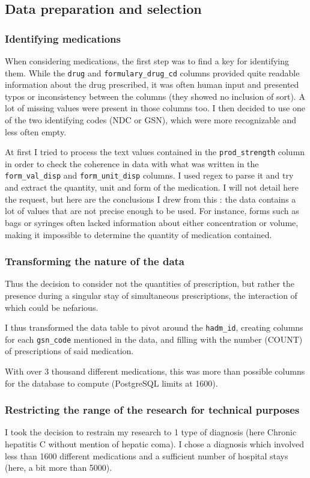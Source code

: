 \documentclass[a4paper,12pt]{article}
\begin{document}
\subsection{Data preparation and selection}
\subsubsection{Identifying medications}
When considering medications, the first step was to find a key for identifying them. While the \texttt{drug} and \texttt{formulary\_drug\_cd} columns provided quite readable information about the drug prescribed, it was often human input and presented typos or inconsistency between the columns (they showed no inclusion of sort). A lot of missing values were present in those columns too. I then decided to use one of the two identifying codes (NDC or GSN), which were more recognizable and less often empty.

At first I tried to process the text values contained in the \texttt{prod\_strength} column in order to check the coherence in data with what was written in the \texttt{form\_val\_disp} and \texttt{form\_unit\_disp} columns. I used regex to parse it and try and extract the quantity, unit and form of the medication. I will not detail here the request, but here are the conclusions I drew from this : the data contains a lot of values that are not precise enough to be used. For instance, forms such as bags or syringes often lacked information about either concentration or volume, making it impossible to determine the quantity of medication contained.

\subsubsection{Transforming the nature of the data}
Thus the decision to consider not the quantities of prescription, but rather the presence during a singular stay of simultaneous prescriptions, the interaction of which could be nefarious.

I thus transformed the data table to pivot around the \texttt{hadm\_id}, creating columns for each \texttt{gsn\_code} mentioned in the data, and filling with the number (COUNT) of prescriptions of said medication.

With over 3 thousand different medications, this was more than possible columns for the database to compute (PostgreSQL limits at 1600). 

\subsubsection{Restricting the range of the research for technical purposes}
I took the decision to restrain my research to 1 type of diagnosis (here Chronic hepatitis C without mention of hepatic coma). I chose a diagnosis which involved less than 1600 different medications and a sufficient number of hospital stays
(here, a bit more than 5000).
\end{document}
